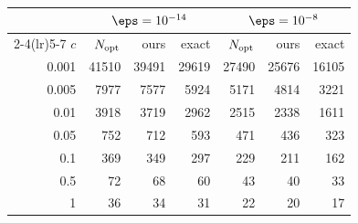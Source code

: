 \begin{tabular}{rrrrrrr}
\toprule
 & \multicolumn{3}{c}{$\eps=10^{-14}$} & \multicolumn{3}{c}{$\eps=10^{-8}$}\\
\cmidrule(lr){2-4}\cmidrule(lr){5-7}
$c$ & $N_{\rm opt}$ & ours & exact & $N_{\rm opt}$ & ours & exact\\
\midrule
0.001 & 41510 & 39491 & 29619 & 27490 & 25676 & 16105\\
0.005 & 7977 & 7577 & 5924 & 5171 & 4814 & 3221\\
0.01 & 3918 & 3719 & 2962 & 2515 & 2338 & 1611\\
0.05 & 752 & 712 & 593 & 471 & 436 & 323\\
0.1 & 369 & 349 & 297 & 229 & 211 & 162\\
0.5 & 72 & 68 & 60 & 43 & 40 & 33\\
1 & 36 & 34 & 31 & 22 & 20 & 17\\
\bottomrule
\end{tabular}